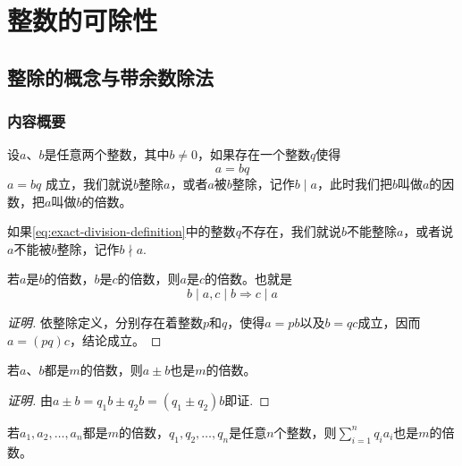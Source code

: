 
\chapter{整数的可除性}
\section{整除的概念与带余数除法}

\subsection*{内容概要}

\begin{definition}
  \label{def:exact-division-definition}
  设$a$、$b$是任意两个整数，其中$b \neq 0$，如果存在一个整数$q$使得
  \begin{equation}
    \label{eq:exact-division-definition}
    a=bq
  \end{equation}
$a=bq$
成立，我们就说$b$整除$a$，或者$a$被$b$整除，记作$b \mid a$，此时我们把$b$叫做$a$的因数，把$a$叫做$b$的倍数。

如果\ref{eq:exact-division-definition}中的整数$q$不存在，我们就说$b$不能整除$a$，或者说$a$不能被$b$整除，记作$b \nmid a$.
\end{definition}

\begin{theorem}
  \label{theorem:transitivity-of-exact-division}
  若$a$是$b$的倍数，$b$是$c$的倍数，则$a$是$c$的倍数。也就是
  \begin{equation}
    \label{eq:transitivity-of-exact-division}
    b \mid a, c \mid b \Rightarrow c \mid a
  \end{equation}
\end{theorem}

\begin{proof}[证明]
  依整除定义，分别存在着整数$p$和$q$，使得$a=pb$以及$b=qc$成立，因而$a=(pq)c$，结论成立。
\end{proof}

\begin{theorem}
  \label{theorem:addivity-of-exact-division}
若$a$、$b$都是$m$的倍数，则$a \pm b$也是$m$的倍数。
\end{theorem}

\begin{proof}[证明]
  由$a \pm b=q_1b \pm q_2 b = (q_1 \pm q_2)b$即证. 
\end{proof}

\begin{theorem}
  \label{theorem:linearity-of-exact-division}
若$a_1,a_2,\ldots,a_n$都是$m$的倍数，$q_1,q_2,\ldots,q_n$是任意$n$个整数，则$\sum_{i=1}^nq_ia_i$也是$m$的倍数。
\end{theorem}

